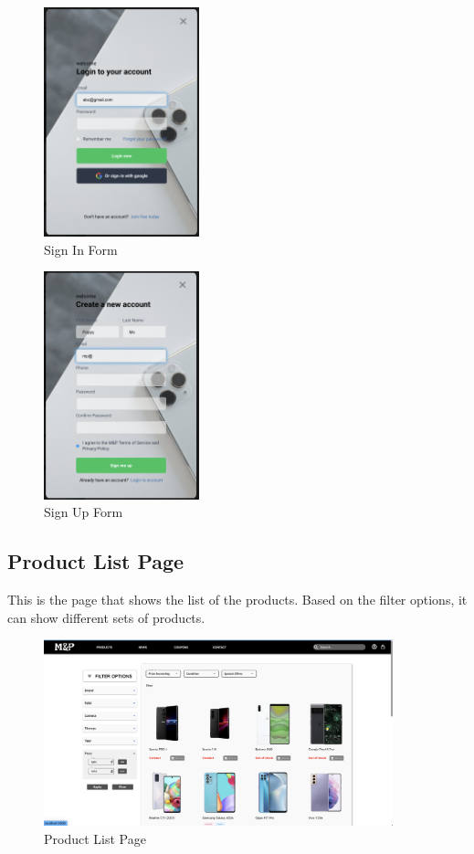 \documentclass[a4paper]{article}
\numberwithin{equation}{section}
\begin{document}
\begin{figure}[H]
  \centering
  \includegraphics[width=0.4\textwidth]{assets/flow/signin.png}
  \caption{Sign In Form}
\end{figure}

\begin{figure}[H]
  \centering
  \includegraphics[width=0.4\textwidth]{assets/flow/signup.png}
  \caption{Sign Up Form}
\end{figure}

\newpage
\subsection{Product List Page}

This is the page that shows the list of the products.
Based on the filter options, it can show different sets of products.

\begin{figure}[H]
  \centering
  \includegraphics[width=0.9\textwidth]{assets/flow/product.png}
  \caption{Product List Page}
\end{figure}
\end{document}
